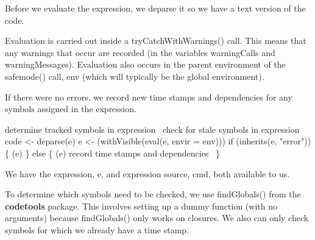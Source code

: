 \documentclass[a4paper]{article}%
\newcommand{\pkg}[1]{{\bf #1}}
\begin{document}
Before we evaluate the expression, we deparse it so we have a text
version of the code.

Evaluation is carried out inside a {\Tt{}tryCatchWithWarnings()\nwendquote} call.
This means that any warnings that occur are recorded (in the variables
{\Tt{}warningCalls\nwendquote} and {\Tt{}warningMessages\nwendquote}).  Evaluation also occurs
in the parent environment of the {\Tt{}safemode()\nwendquote} call, {\Tt{}env\nwendquote} (which will
typically be the global environment).  

If there were no errors, we record new time stamps and dependencies
for any symbols assigned in the expression.

\nwenddocs{}\endmoddef\nwstartdeflinemarkup{}\nwenddeflinemarkup
\LA{}determine tracked symbols in expression~{\nwtagstyle{}}\RA{}
\LA{}check for stale symbols in expression~{\nwtagstyle{}}\RA{}
code <- deparse(e)                                 
e <- (withVisible(eval(e,
                                           envir = env)))
if (inherits(e, "error")) \{
    (e)
\} else \{
    (e)
    \LA{}record time stamps and dependencies~{\nwtagstyle{}}\RA{}
\}
\nwendcode{}\nwdocspar

We have the expression, {\Tt{}e\nwendquote}, and expression source, {\Tt{}cmd\nwendquote},
both available to us.

To determine which symbols need to be checked, we use 
{\Tt{}findGlobals()\nwendquote} from the \pkg{codetools} package.
This involves setting up a dummy function (with no arguments)
because {\Tt{}findGlobals()\nwendquote}
only works on closures.  We also can only check symbols for which
we already have a time stamp.
\end{document}
